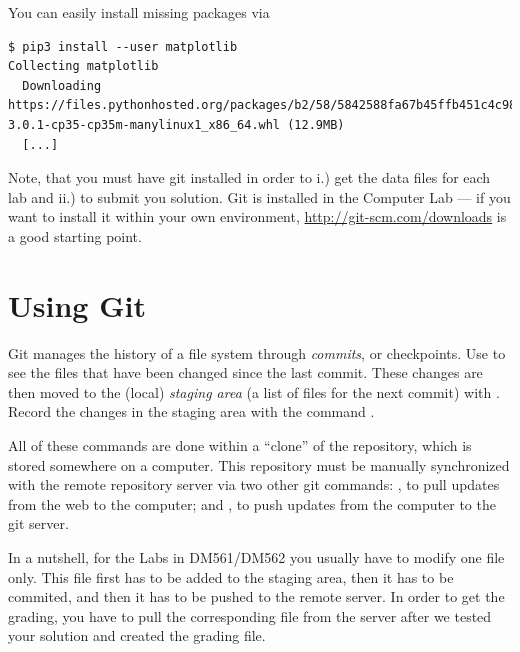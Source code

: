 \begin{enumerate}
You can easily install missing packages via

\begin{lstlisting}
$ pip3 install --user matplotlib
Collecting matplotlib
  Downloading https://files.pythonhosted.org/packages/b2/58/5842588fa67b45ffb451c4c98eda283c0c42b8f2c5e503e4f6d9ff3c3a63/matplotlib-3.0.1-cp35-cp35m-manylinux1_x86_64.whl (12.9MB)
  [...]
  \end{lstlisting}

\end{enumerate}


Note, that you must have git installed in order to i.) get the data files for each lab and ii.) to submit you solution. Git is installed in the Computer Lab --- if you want to install it within your own environment, \url{http://git-scm.com/downloads} is a good starting point.

\section*{Using Git} %

Git manages the history of a file system through \emph{commits}, or checkpoints.
Use  to see the files that have been changed since the last commit.
These changes are then moved to the (local) \emph{staging area} (a list of files for the next commit) with .
Record the changes in the staging area with the command .

All of these commands are done within a ``clone'' of the repository, which is stored somewhere on a computer.
This repository must be manually synchronized with the remote repository server via two other git commands: , to pull updates from the web to the computer; and , to push updates from the computer to the git server.

In a nutshell, for the Labs in DM561/DM562 you usually have to modify one file only. This file first has to be added to the staging area, then it has to be commited, and then it has to be pushed to the remote server. In order to get the grading, you have to pull the corresponding file from the server after we tested your solution and created the grading file.

